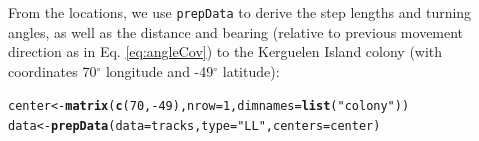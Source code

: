 \documentclass[12pt]{article}\usepackage[]{graphicx}\usepackage[]{xcolor}
\makeatletter
\newcommand{\hlnum}[1]{\textcolor[rgb]{0.686,0.059,0.569}{#1}}%
\newcommand{\hlsng}[1]{\textcolor[rgb]{0.192,0.494,0.8}{#1}}%
\newcommand{\hlopt}[1]{\textcolor[rgb]{0,0,0}{#1}}%
\newcommand{\hldef}[1]{\textcolor[rgb]{0.345,0.345,0.345}{#1}}%
\newcommand{\hlkwb}[1]{\textcolor[rgb]{0.69,0.353,0.396}{#1}}%
\newcommand{\hlkwc}[1]{\textcolor[rgb]{0.333,0.667,0.333}{#1}}%
\newcommand{\hlkwd}[1]{\textcolor[rgb]{0.737,0.353,0.396}{\textbf{#1}}}%
\newenvironment{kframe}{%
 \def\at@end@of@kframe{}%
 \ifinner\ifhmode%
  \def\at@end@of@kframe{\end{minipage}}%
  \begin{minipage}{\columnwidth}%
 \fi\fi%
 \def\FrameCommand##1{\hskip\@totalleftmargin \hskip-\fboxsep
 \colorbox{shadecolor}{##1}\hskip-\fboxsep
     \hskip-\linewidth \hskip-\@totalleftmargin \hskip\columnwidth}%
 \MakeFramed {\advance\hsize-\width
   \@totalleftmargin\z@ \linewidth\hsize
   \@setminipage}}%
 {\par\unskip\endMakeFramed%
 \at@end@of@kframe}
\newenvironment{knitrout}{}{} %
\let\hlstd\hldef
\let\hlstr\hlsng
\makeatother
\begin{document}
From the locations, we use \verb|prepData| to derive the step lengths and turning angles, as well as the distance and bearing (relative to previous movement direction as in Eq. \ref{eq:angleCov}) to the Kerguelen Island colony (with coordinates 70$^{\circ}$ longitude and -49$^{\circ}$ latitude):
\begin{knitrout}
\color{fgcolor}\begin{kframe}
\begin{alltt}
\hlstd{center} \hlkwb{<-} \hlkwd{matrix}\hlstd{(}\hlkwd{c}\hlstd{(}\hlnum{70}\hlstd{,}\hlopt{-}\hlnum{49}\hlstd{),}\hlkwc{nrow}\hlstd{=}\hlnum{1}\hlstd{,}\hlkwc{dimnames}\hlstd{=}\hlkwd{list}\hlstd{(}\hlstr{"colony"}\hlstd{))}
\hlstd{data} \hlkwb{<-} \hlkwd{prepData}\hlstd{(}\hlkwc{data}\hlstd{=tracks,} \hlkwc{type}\hlstd{=}\hlstr{"LL"}\hlstd{,} \hlkwc{centers}\hlstd{=center)}
\end{alltt}


{\ttfamily\noindent\itshape\color{messagecolor}{\#\# Calculating movement metrics...}}


\end{kframe}
\end{knitrout}
\end{document}
